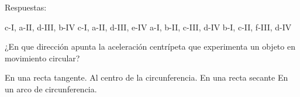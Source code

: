 \documentclass[12pt, letter]{exam}
\begin{document}
\begin{questions}
\begin{multicols}{2}
    \end{multicols}
    
    \vspace*{0.25cm}
    Respuestas:
    \begin{multicols}{2}
    \begin{tasks}
        \task c-I, a-II, d-III, b-IV
        \task c-I, a-II, d-III, e-IV
        \task a-I, b-II, c-III, d-IV
        \task b-I, c-II, f-III, d-IV
    \end{tasks}
    \end{multicols}

    \newpage

    \question ¿En que dirección apunta la aceleración centrípeta que experimenta un objeto en movimiento circular?
    \begin{multicols}{2}
    \begin{tasks}
        \task En una recta tangente.
        \task Al centro de la circunferencia.
        \task En una recta secante
        \task En un arco de circunferencia.
    \end{tasks}
    \end{multicols}
    



\end{questions}
\end{document}
